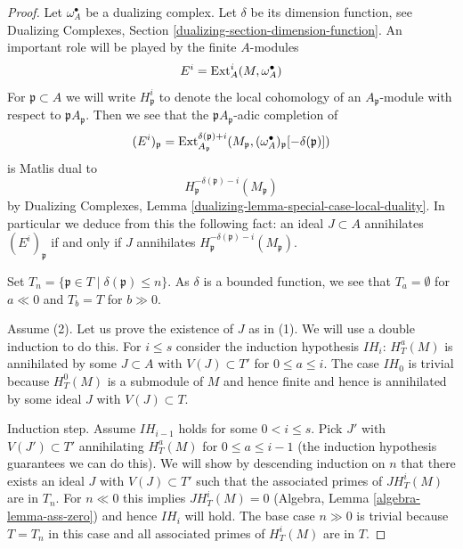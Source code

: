 \begin{proof}
Let $\omega_A^\bullet$ be a dualizing complex. Let $\delta$ be its
dimension function, see Dualizing Complexes, Section
\ref{dualizing-section-dimension-function}.
An important role will be played by the finite $A$-modules
$$
E^i = \mathop{\mathrm{Ext}}\nolimits_A^i(M, \omega_A^\bullet)
$$
For $\mathfrak p \subset A$ we will write $H^i_\mathfrak p$ to denote the
local cohomology of an $A_\mathfrak p$-module with respect to
$\mathfrak pA_\mathfrak p$. Then we see that
the $\mathfrak pA_\mathfrak p$-adic completion of
$$
(E^i)_\mathfrak p =
\mathop{\mathrm{Ext}}\nolimits^{\delta(\mathfrak p) + i}_{A_\mathfrak p}(M_\mathfrak p,
(\omega_A^\bullet)_\mathfrak p[-\delta(\mathfrak p)])
$$
is Matlis dual to
$$
H^{-\delta(\mathfrak p) - i}_{\mathfrak p}(M_\mathfrak p)
$$
by
Dualizing Complexes, Lemma \ref{dualizing-lemma-special-case-local-duality}.
In particular we deduce from this the
following fact: an ideal $J \subset A$ annihilates
$(E^i)_\mathfrak p$ if and only if $J$ annihilates
$H^{-\delta(\mathfrak p) - i}_{\mathfrak p}(M_\mathfrak p)$.

\medskip\noindent
Set $T_n = \{\mathfrak p \in T \mid \delta(\mathfrak p) \leq n\}$.
As $\delta$ is a bounded function, we see that
$T_a = \emptyset$ for $a \ll 0$ and $T_b = T$ for $b \gg 0$.

\medskip\noindent
Assume (2). Let us prove the existence of $J$ as in (1).
We will use a double induction to do this. For $i \leq s$
consider the induction hypothesis $IH_i$:
$H^a_T(M)$ is annihilated by some $J \subset A$ with $V(J) \subset T'$
for $0 \leq a \leq i$. The case $IH_0$ is trivial
because $H^0_T(M)$ is a submodule of $M$ and hence finite
and hence is annihilated by some ideal $J$ with $V(J) \subset T$.

\medskip\noindent
Induction step. Assume $IH_{i - 1}$ holds for some $0 < i \leq s$.
Pick $J'$ with $V(J') \subset T'$ annihilating $H^a_T(M)$ for
$0 \leq a \leq i - 1$ (the induction hypothesis guarantees we can
do this). We will show by descending induction on $n$
that there exists an ideal $J$ with $V(J) \subset T'$ such that the
associated primes of $J H^i_T(M)$ are in $T_n$.
For $n \ll 0$ this implies $JH^i_T(M) = 0$ 
(Algebra, Lemma \ref{algebra-lemma-ass-zero})
and hence $IH_i$ will hold.
The base case $n \gg 0$ is trivial because $T = T_n$ in this case
and all associated primes of $H^i_T(M)$ are in $T$.


\end{proof}

